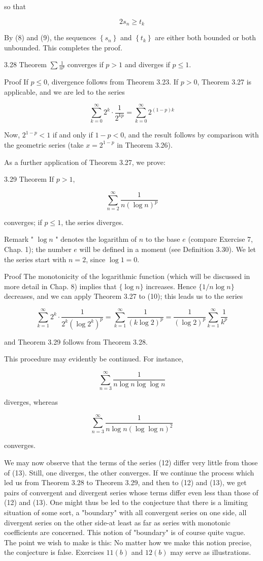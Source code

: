 \documentclass[10pt]{article}
\begin{document}
so that

$$
2 s_{n} \geq t_{k}
$$

By (8) and (9), the sequences $\left\{s_{n}\right\}$ and $\left\{t_{k}\right\}$ are either both bounded or both unbounded. This completes the proof.

3.28 Theorem $\sum \frac{1}{n^{p}}$ converges if $p>1$ and diverges if $p \leq 1$.

Proof If $p \leq 0$, divergence follows from Theorem 3.23. If $p>0$, Theorem 3.27 is applicable, and we are led to the series

$$
\sum_{k=0}^{\infty} 2^{k} \cdot \frac{1}{2^{k p}}=\sum_{k=0}^{\infty} 2^{(1-p) k}
$$

Now, $2^{1-p}<1$ if and only if $1-p<0$, and the result follows by comparison with the geometric series (take $x=2^{1-p}$ in Theorem 3.26).

As a further application of Theorem 3.27, we prove:

3.29 Theorem If $p>1$,

$$
\sum_{n=2}^{\infty} \frac{1}{n(\log n)^{p}}
$$

converges; if $p \leq 1$, the series diverges.

Remark " $\log n$ " denotes the logarithm of $n$ to the base $e$ (compare Exercise 7, Chap. 1); the number $e$ will be defined in a moment (see Definition 3.30). We let the series start with $n=2$, since $\log 1=0$.

Proof The monotonicity of the logarithmic function (which will be discussed in more detail in Chap. 8) implies that $\{\log n\}$ increases. Hence $\{1 / n \log n\}$ decreases, and we can apply Theorem 3.27 to (10); this leads us to the series

$$
\sum_{k=1}^{\infty} 2^{k} \cdot \frac{1}{2^{k}\left(\log 2^{k}\right)^{p}}=\sum_{k=1}^{\infty} \frac{1}{(k \log 2)^{p}}=\frac{1}{(\log 2)^{p}} \sum_{k=1}^{\infty} \frac{1}{k^{p}}
$$

and Theorem 3.29 follows from Theorem 3.28.

This procedure may evidently be continued. For instance,

$$
\sum_{n=3}^{\infty} \frac{1}{n \log n \log \log n}
$$

diverges, whereas

$$
\sum_{n=3}^{\infty} \frac{1}{n \log n(\log \log n)^{2}}
$$

converges.

We may now observe that the terms of the series (12) differ very little from those of (13). Still, one diverges, the other converges. If we continue the process which led us from Theorem 3.28 to Theorem 3.29, and then to (12) and (13), we get pairs of convergent and divergent series whose terms differ even less than those of (12) and (13). One might thus be led to the conjecture that there is a limiting situation of some sort, a "boundary" with all convergent series on one side, all divergent series on the other side-at least as far as series with monotonic coefficients are concerned. This notion of "boundary" is of course quite vague. The point we wish to make is this: No matter how we make this notion precise, the conjecture is false. Exercises $11(b)$ and $12(b)$ may serve as illustrations.
\end{document}
